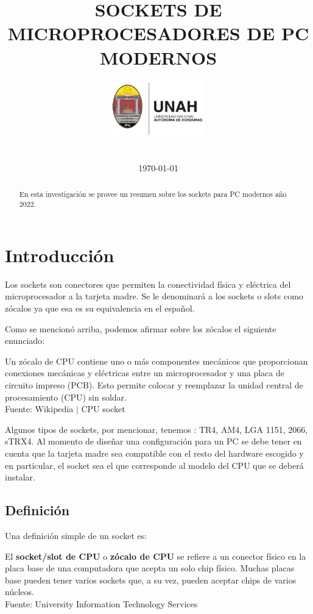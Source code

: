 \documentclass[conference]{IEEEtran}
\title{SOCKETS DE MICROPROCESADORES DE PC MODERNOS}
\author{
\includegraphics[width = 40mm]{images/logo-unah.png}\\[8ex]
\IEEEauthorblockN{Tobias Briones}
\IEEEauthorblockN{tobias.briones@unah.hn}
\IEEEauthorblockA{\textit{Universidad Nacional Autónoma de Honduras} \\
\textit{Ingeniería de Sistemas} \\
\textit{I PAC 2022} \\
\textit{IS911-MICROPROCESADORES}} \\\vspace*{20pt} \normalsize  \\
\today
}
\begin{document}
\maketitle

\begin{abstract}
En esta investigación se provee un resumen sobre los sockets para PC modernos año 2022.
\end{abstract}

\section{Introducción}

Los sockets son conectores que permiten la conectividad física y eléctrica del microprocesador a la tarjeta madre. Se le denominará a los sockets o slots como zócalos ya que esa es su equivalencia en el español.

\bigbreak

Como se mencionó arriba, podemos afirmar sobre los zócalos el siguiente enunciado:

\begin{displayquote}
    Un zócalo de CPU contiene uno o más componentes mecánicos que proporcionan conexiones mecánicas y eléctricas entre un microprocesador y una placa de circuito impreso (PCB). Esto permite colocar y reemplazar la unidad central de procesamiento (CPU) sin soldar.\\
    \small Fuente: Wikipedia $\mid$ CPU socket \cite{wikipedia-contributors-2022}
\end{displayquote}

\bigbreak

Algunos tipos de sockets, por mencionar, tenemos \cite{authortechnews-2020}: TR4, AM4, LGA 1151, 2066, sTRX4. Al momento de diseñar una configuración para un PC se debe tener en cuenta que la tarjeta madre sea compatible con el resto del hardware escogido y en particular, el socket sea el que corresponde al modelo del CPU que se deberá instalar.

\subsection{Definición}

Una definición simple de un socket es:

\begin{displayquote}
    El \textbf{socket/slot de CPU} o \textbf{zócalo de CPU} se refiere a un conector físico en la placa base de una computadora que acepta un solo chip físico. Muchas placas base pueden tener varios sockets que, a su vez, pueden aceptar chips de varios núcleos.\\
    \small Fuente: University Information Technology Services \cite{university-information-technology-services-2019}
\end{displayquote}
\end{document}
